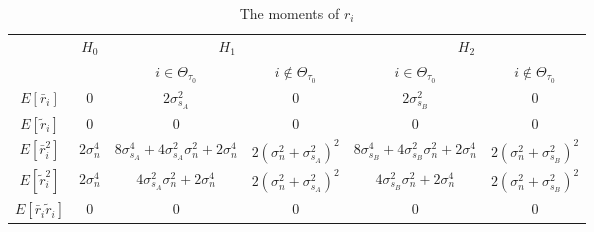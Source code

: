 \begin{table}[h]
\centering
  \begin{tabular}{|c|c|c|c|c|c|}
	\hline
	\multirow{2}{*}{}           & \multirow{2}{*}{$H_0$} & \multicolumn{2}{c|}{$H_1$}                                                               & \multicolumn{2}{c|}{$H_2$}                                                               \\ \cline{3-6} 
	&                        & $i \in \Theta_{\tau_0}$                                                   & $i\notin \Theta_{\tau_0}$                          & $i\in \Theta_{\tau_0}$                                                   & $i\notin \Theta_{\tau_0}$                          \\ \hline
	$E[\bar{r}_i]$              & $0$                    & $2\sigma_{s_A}^2$                                       & $0$                            & $2\sigma_{s_B}^2$                                                         & $0$                            \\ \hline
	$E[\tilde{r}_i]$            & $0$                    & $0$                                                     & $0$                            & $0$                                                     & $0$                            \\ \hline
	$E[\bar{r}_i^2]$            & $2\sigma_n^4$          & $8\sigma_{s_A}^4+4\sigma_{s_A}^2\sigma_n^2+2\sigma_n^4$ & $2(\sigma_n^2+\sigma_{s_A}^2)^2$ & $8\sigma_{s_B}^4+4\sigma_{s_B}^2\sigma_n^2+2\sigma_n^4$ & $2(\sigma_n^2+\sigma_{s_B}^2)^2$ \\ \hline
	$E[\tilde{r}_i^2]$          & $2\sigma_n^4$          & $4\sigma_{s_A}^2\sigma_n^2+2\sigma_n^4$                 & $2(\sigma_n^2+\sigma_{s_A}^2)^2$ & $4\sigma_{s_B}^2\sigma_n^2+2\sigma_n^4$                 & $2(\sigma_n^2+\sigma_{s_B}^2)^2$ \\ \hline
	$E[\bar{r}_i\tilde{r}_i]$   & $0$                    & $0$                                                     & $0$                            & $0$                                                     & $0$                            \\ \hline
  \end{tabular}
  \caption{The moments of $r_i$}
  \label{Table1}
\end{table}

